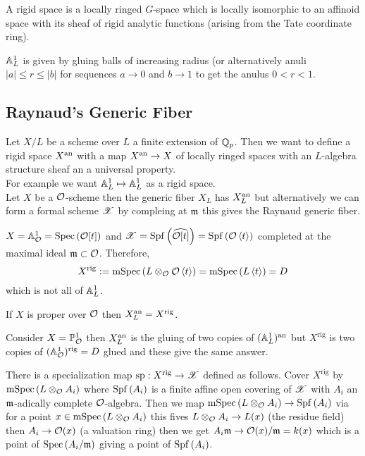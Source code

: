 \documentclass[12pt]{article}
\begin{document}
\begin{defn}
A rigid space is a locally ringed $G$-space which is locally isomorphic to an affinoid space with its sheaf of rigid analytic functions (arising from the Tate coordinate ring). 
\end{defn}

\begin{example}
$\mathbb{A}^1_L$ is given by gluing balls of increasing radius (or alternatively anuli $|a| \le r \le |b|$ for sequences $a \to 0$ and $b \to 1$ to get the anulus $0 < r < 1$. 
\end{example}

\subsection{Raynaud's Generic Fiber}

Let $X / L$ be a scheme over $L$ a finite extension of $\mathbb{Q}_p$. Then we want to define a rigid space $X^{\mathrm{an}}$ with a map $X^{\mathrm{an}} \to X$ of locally ringed spaces with an $L$-algebra structure sheaf an a universal property. 
\bigskip\\
For example we want $\mathbb{A}^1_L \mapsto \mathbb{A}^1_L$ as a rigid space. 
\bigskip\\
Let $X$ be a $\mathcal{O}$-scheme then the generic fiber $X_L$ has $X_L^{\mathrm{an}}$ but alternatively we can form a formal scheme $\mathscr{X}$ by compleing at $\mathfrak{m}$ this gives the Raynaud generic fiber.

\newcommand{\rig}{\mathrm{rig}}

\begin{example}
$X = \mathbb{A}^1_{\mathcal{O}} = \mathrm{Spec}\left( \mathcal{O}[t] \right)$ and $\mathscr{X} = \mathrm{Spf}\left( \widehat{\mathcal{O}[t]} \right) = \mathrm{Spf}\left( \mathcal{O}\left< t \right> \right)$ completed at the maximal ideal $\mathfrak{m} \subset \mathcal{O}$.
Therefore,
\[ X^{\rig} := \mSpec{L \ot_{\cO} \cO \left< t \right>} = \mSpec{L \left< t \right>} = D \]
which is not all of $\mathbb{A}^1_L$. 
\end{example}

\begin{thm}
If $X$ is proper over $\mathcal{O}$ then $X^{\mathrm{an}}_L = X^{\text{rig}}$. 
\end{thm}

\begin{example}
Consider $X = \mathbb{P}^1_{\mathcal{O}}$ then $X^{\mathrm{an}}_L$ is the gluing of two copies of $(\mathbb{A}^1_L)^{\mathrm{an}}$ but $X^{\rig}$ is two copies of $(\A^1_{\cO})^\rig = D$ glued and these give the same answer.
\end{example}


\begin{defn}
There is a specialization map $\mathrm{sp} : X^\rig \to \X$ defined as follows. Cover $X^\rig$ by $\mathrm{mSpec}\left( L \otimes_{\mathcal{O}} A_i \right)$ where $\mathrm{Spf}\left( A_i \right)$ is a finite affine open covering of $\mathscr{X}$ with $A_i$ an $\mathfrak{m}$-adically complete $\mathcal{O}$-algebra. Then we map $\mathrm{mSpec}\left( L \otimes_{\mathcal{O}} A_i \right) \to \mathrm{Spf}\left( A_i \right)$ via for a point $x \in \mathrm{mSpec}\left( L \otimes_{\mathcal{O}} A_i \right)$ this fives $L \otimes_{\mathcal{O}} A_i \to L(x)$ (the residue field) then $A_i \to \mathcal{O}(x)$ (a valuation ring) then we get $A_i \mathfrak{m} \to \mathcal{O}(x) / \mathfrak{m} = k(x)$ which is a point of $\mathrm{Spec}\left( A_i / \mathfrak{m} \right)$ giving a point of $\mathrm{Spf}\left( A_i \right)$. 
\end{defn}
\end{document}
